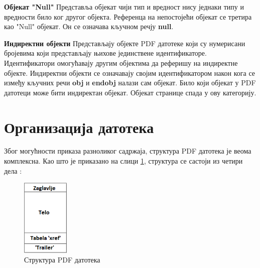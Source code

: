 \documentclass[12pt,oneside]{memoir}
\begin{document}
\begin{description}
\item \textbf{Објекат "Null"} Представља објекат чији тип и вредност нису једнаки типу и вредности било ког другог објекта. Референца на непостојећи објекат се третира као "Null" објекат. Он се означава кључном речју \textbf{null}.
\item \textbf{Индиректни објекти} Представљају објекте PDF датотеке који су нумерисани бројевима који представљају њихове јединствене идентификаторе. Идентификатори омогућавају другим објектима да реферишу на индиректне објекте. Индиректни објекти се означавају својим идентификатором након кога се између кључних речи \textbf{obj} и \textbf{endobj} налази сам објекат. Било који објекат у PDF датотеци може бити индиректан објекат. Објекат странице спада у ову категорију.
\end{description} 

\section{Организација датотека}
\label{sec:organiyacijaDatotekaPDF}

Због могућности приказа разноликог садржаја, структура PDF датотека је веома комплексна. Као што је приказано на слици \ref{fig:pdfStruktura1}, структура се састоји из четири дела \cite{PDFDoc, introToPdf, basicStrPdf}:

\begin{figure}[!ht]
\centering
\includegraphics[width=0.2\textwidth]{pdfStruktura1.png}
\caption{Структура PDF датотека}
\label{fig:pdfStruktura1}
\end{figure}
\end{document}
